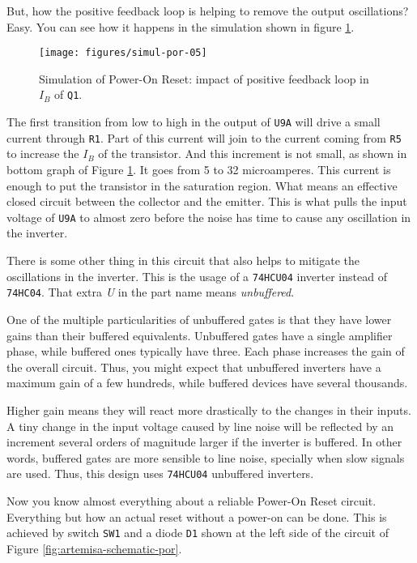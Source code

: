 But, how the positive feedback loop is helping to remove the output oscillations? Easy. You can see how it happens in the simulation shown in figure \ref{fig:simul-por-05}.

\begin{figure}[htb]
  \centering
  \texttt{[image: figures/simul-por-05]}
  \caption{Simulation of Power-On Reset: impact of positive feedback loop in $I_B$ of {\tt Q1}.}
  \label{fig:simul-por-05}
\end{figure}

The first transition from low to high in the output of {\tt U9A} will drive a small current through {\tt R1}. Part of this current will join to the current coming from {\tt R5} to increase the $I_B$ of the transistor. And this increment is not small, as shown in bottom graph of Figure \ref{fig:simul-por-05}. It goes from 5 to 32 microamperes. This current is enough to put the transistor in the saturation region. What means an effective closed circuit between the collector and the emitter. This is what pulls the input voltage of {\tt U9A} to almost zero before the noise has time to cause any oscillation in the inverter.

There is some other thing in this circuit that also helps to mitigate the oscillations in the inverter. This is the usage of a {\tt 74HCU04} inverter instead of {\tt 74HC04}. That extra {\it U} in the part name means {\it unbuffered}.

One of the multiple particularities of unbuffered gates is that they have lower gains than their buffered equivalents. Unbuffered gates have a single amplifier phase, while buffered ones typically have three. Each phase increases the gain of the overall circuit. Thus, you might expect that unbuffered inverters have a maximum gain of a few hundreds, while buffered devices have several thousands.

Higher gain means they will react more drastically to the changes in their inputs. A tiny change in the input voltage caused by line noise will be reflected by an increment several orders of magnitude larger if the inverter is buffered. In other words, buffered gates are more sensible to line noise, specially when slow signals are used. Thus, this design uses {\tt 74HCU04} unbuffered inverters.

Now you know almost everything about a reliable Power-On Reset circuit. Everything but how an actual reset without a power-on can be done. This is achieved by switch {\tt SW1} and a diode {\tt D1} shown at the left side of the circuit of Figure \ref{fig:artemisa-schematic-por}.

